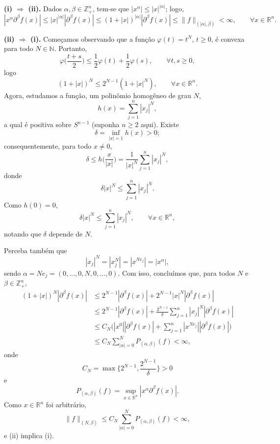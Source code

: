 \documentclass[../distribution_theory_notes.tex]{subfiles}
\begin{document}
\begin{proof*}
	\textbf{(i) \(\Rightarrow\) (ii).} Dados \(\alpha ,\beta \in \mathbb{Z}_{+}^{n}\), tem-se que \(|x^{\alpha }|\leq |x|^{|\alpha |}\); logo,
	\[
		|x^{\alpha }\partial ^{\beta }f(x)|
		\leq |x|^{|\alpha |}|\partial ^{\beta }f(x)|
		\leq (1+|x|)^{|\alpha |}|\partial ^{\beta }f(x)|
		\leq \|f\|_{(|\alpha |,\beta )}<\infty ,\qquad \forall x\in \mathbb{R}^{n}.
	\]

	\textbf{(ii) \(\Rightarrow\) (i).} Começamos observando que a função \(\varphi (t)=t^{N}\), \(t\geq 0\), é convexa para todo \(N\in \mathbb{N}\). Portanto,
	\[
		\varphi \biggl(\frac{t+s}{2}\biggr)\leq \frac{1}{2}\varphi (t)+\frac{1}{2}\varphi (s),\qquad \forall t,s\geq 0,
	\]
	logo
	\[
		(1+|x|)^{N}\leq 2^{N-1}(1+|x|^{N}),\qquad \forall x\in \mathbb{R}^{n}.
	\]
	Agora, estudamos a função, um polinômio homogêneo de grau \(N\),
	\[
		h(x)=\sum_{j=1}^{n}|x_{j}|^{N},
	\]
	a qual é positiva sobre \(S^{n-1}\) (suponha \(n\geq 2\) aqui). Existe
	\[
		\delta =\inf_{|x|=1}h(x)>0;
	\]
	consequentemente, para todo \(x\neq 0\),
	\[
		\delta \leq h\biggl(\frac{x}{|x|}\biggr)
		=\frac{1}{|x|^{N}}\sum_{j=1}^{n}|x_{j}|^{N},
	\]
	donde
	\[
		\delta |x|^{N}\leq \sum_{j=1}^{n}|x_{j}|^{N}.
	\]
	Como \(h(0)=0\),
	\[
		\delta |x|^{N}\leq \sum_{j=1}^{n}|x_{j}|^{N},\qquad \forall x\in \mathbb{R}^{n},
	\]
	notando que \(\delta \) depende de \(N\).

	Perceba também que
	\[
		|x_{j}|^{N}=|x_{j}^{N}|=|x^{Ne_{j}}|=|x^{\alpha }|,
	\]
	sendo \(\alpha =Ne_{j}=(0,\dotsc ,0,N,0,\dotsc ,0)\). Com isso, concluímos que, para todos \(N\) e \(\beta \in \mathbb{Z}_{+}^{n}\),
	\begin{align*}
		(1+|x|)^{N}|\partial ^{\beta }f(x)|
		 & \leq 2^{N-1}|\partial ^{\beta }f(x)|+2^{N-1}|x|^{N}|\partial ^{\beta }f(x)|                                   \\
		 & \leq 2^{N-1}|\partial ^{\beta }f(x)|+\frac{2^{N-1}}{\delta }\sum_{j=1}^{n}|x_{j}|^{N}|\partial ^{\beta }f(x)| \\
		 & \leq C_{N}\biggl(|x^{0}||\partial ^{\beta }f(x)|+\sum_{j=1}^{n}|x^{Ne_{j}}||\partial ^{\beta }f(x)|\biggr)    \\
		 & \leq C_{N}\sum_{|\alpha |=0}^{N}P_{(\alpha ,\beta )}(f)<\infty ,
	\end{align*}
	onde
	\[
		C_{N}=\max \biggl\{2^{N-1},\frac{2^{N-1}}{\delta }\biggr\}>0
	\]
	e
	\[
		P_{(\alpha ,\beta )}(f)=\sup_{x\in \mathbb{R}^{n}}|x^{\alpha }\partial ^{\beta }f(x)|.
	\]
	Como \(x\in \mathbb{R}^{n}\) foi arbitrário,
	\[
		\|f\|_{(N,\beta )}\leq C_{N}\sum_{|\alpha |=0}^{N}P_{(\alpha ,\beta )}(f)<\infty ,
	\]
	e (ii) implica (i).


\end{proof*}
\end{document}
